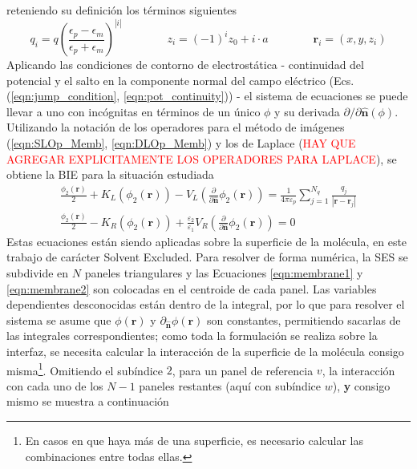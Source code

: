 \documentclass[12pt, oneside, numbers, spanish]{ezthesis}
\numberwithin{equation}{section}
\begin{document}
reteniendo su definición los términos siguientes
\begin{equation*}
q_i = q\left(\frac{\epsilon_p - \epsilon_m}{\epsilon_p + \epsilon_m}\right)^{|i|} \qquad\qquad z_i=(-1)^iz_0 + i\cdot a \qquad\qquad \mathbf{r}_i = (x, y, z_i)
\end{equation*}
Aplicando las condiciones de contorno de electrostática - continuidad del potencial y el salto en la componente normal del campo eléctrico (Ecs. (\ref{eqn:jump_condition}, \ref{eqn:pot_continuity})) - el sistema de ecuaciones se puede llevar a uno con incógnitas en términos de un único $\phi$ y su derivada $\partial/\partial\hat{\mathbf{n}}(\phi)$. Utilizando la notación de los operadores para el método de imágenes (\ref{eqn:SLOp_Memb}, \ref{eqn:DLOp_Memb}) y los de Laplace (\textcolor{red}{HAY QUE AGREGAR EXPLICITAMENTE LOS OPERADORES PARA LAPLACE}), se obtiene la BIE para la situación estudiada
\begin{gather}
\frac{\phi_2(\mathbf{r})}{2} + K_L(\phi_2(\mathbf{r})) - V_L\left(\frac{\partial}{\partial\hat{\mathbf{n}}}\phi_2(\mathbf{r})\right) = \frac{1}{4\pi\varepsilon_p}\sum_{j = 1}^{N_q}\frac{q_j}{|\mathbf{r} - \mathbf{r}_j|}\\
\frac{\phi_2(\mathbf{r})}{2} - K_R(\phi_2(\mathbf{r})) + \frac{\varepsilon_2}{\varepsilon_1}V_R\left(\frac{\partial}{\partial\hat{\mathbf{n}}}\phi_2(\mathbf{r})\right) = 0
\end{gather}
Estas ecuaciones están siendo aplicadas sobre la superficie de la molécula, en este trabajo de carácter Solvent Excluded. Para resolver de forma numérica, la SES se subdivide en $N$ paneles triangulares y las Ecuaciones \ref{eqn:membrane1} y \ref{eqn:membrane2} son colocadas en el centroide de cada panel. Las variables dependientes desconocidas están dentro de la integral, por lo que para resolver el sistema se asume que $\phi(\mathbf{r})$ y $\partial_{\hat{\mathbf{n}}}\phi(\mathbf{r})$ son constantes, permitiendo sacarlas de las integrales correspondientes; como toda la formulación se realiza sobre la interfaz, se necesita calcular la interacción de la superficie de la molécula consigo misma\footnote{En casos en que haya más de una superficie, es necesario calcular las combinaciones entre todas ellas.}. Omitiendo el subíndice $2$, para un panel de referencia $v$, la interacción con cada uno de los $N-1$ paneles restantes (aquí con subíndice $w$), \textbf{y} consigo mismo se muestra a continuación
\end{document}
